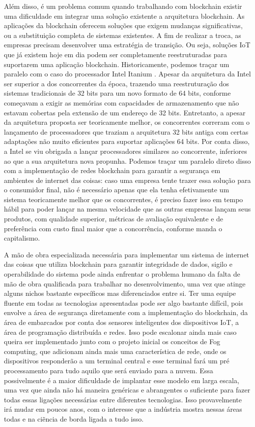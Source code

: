 Além disso, é um problema comum quando trabalhando com blockchain existir uma dificuldade em integrar uma solução existente a arquitetura blockchain. As aplicações da blockchain oferecem soluções que exigem mudanças significativas, ou a substituição completa de sistemas existentes. A fim de realizar a troca, as empresas precisam desenvolver uma estratégia de transição. Ou seja, soluções IoT que já existem hoje em dia podem ser completamente reestruturadas para suportarem uma aplicação blockchain. Historicamente, podemos traçar um paralelo com o caso do processador Intel Itanium \cite{crawford2000introducing}. Apesar da arquitetura da Intel ser superior a dos concorrentes da época, trazendo uma reestruturação dos sistemas tradicionais de 32 bits para um novo formato de 64 bits, conforme começavam a exigir as memórias com capacidades de armazenamento que não estavam cobertas pela extensão de um endereço de 32 bits. Entretanto, a apesar da arquitetura proposta ser teoricamente melhor, os concorrentes correram com o lançamento de processadores que traziam a arquitetura 32 bits antiga com certas adaptações não muito eficientes para suportar aplicações 64 bits. Por conta disso, a Intel se viu obrigada a lançar processadores similares ao concorrente, inferiores ao que a sua arquitetura nova propunha. Podemos traçar um paralelo direto disso com a implementação de redes blockchain para garantir a segurança em ambientes de internet das coisas: caso uma empresa tente trazer essa solução para o consumidor final, não é necessário apenas que ela tenha efetivamente um sistema teoricamente melhor que os concorrentes, é preciso fazer isso em tempo hábil para poder lançar na mesma velocidade que as outras empresas lançam seus produtos, com qualidade superior, métricas de avaliação equivalente e de preferência com custo final maior que a concorrência, conforme manda o capitalismo.

A mão de obra especializada necessária para implementar um sistema de internet das coisas que utiliza blockchain para garantir integridade de dados, sigilo e operabilidade do sistema pode ainda enfrentar o problema humano da falta de mão de obra qualificada para trabalhar no desenvolvimento, uma vez que atinge alguns nichos bastante específicos mas diferenciados entre si. Ter uma equipe fluente em todas as tecnologias apresentadas pode ser algo bastante difícil, pois envolve a área de segurança diretamente com a implementação do blockchain, da área de embarcados por conta dos sensores inteligentes dos dispositivos IoT, a área de programação distribuída e redes. Isso pode escalonar ainda mais caso queira ser implementado junto com o projeto inicial os conceitos de Fog computing, que adicionam ainda mais uma característica de rede, onde os dispositivos responderão a um terminal central e esse terminal fará um pré processamento para tudo aquilo que será enviado para a nuvem. Essa possivelmente é a maior dificuldade de implantar esse modelo em larga escala, uma vez que ainda não há maneira genéricas e abrangentes o suficiente para fazer todas essas ligações necessárias entre diferentes tecnologias. Isso provavelmente irá mudar em poucos anos, com o interesse que a indústria mostra nessas áreas todas e na ciẽncia de borda ligada a tudo isso.